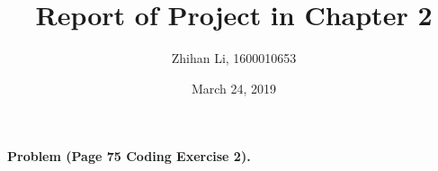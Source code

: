 \documentclass[english, nochinese]{pnote}
\title{Report of Project in Chapter 2}
\author{Zhihan Li, 1600010653}
\date{March 24, 2019}
\begin{document}
\maketitle

\textbf{Problem (Page 75 Coding Exercise 2).} 
\end{document}
